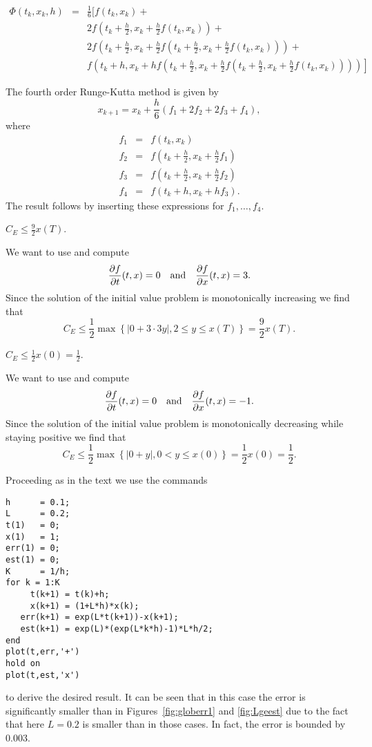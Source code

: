 \documentclass{ximera}
\begin{document}
 \ans
\begin{eqnarray*}
\Phi(t_k,x_k,h) & = & \frac{1}{6}\Big[f(t_k,x_k)+\\
&&2f\left(t_k+\frac{h}{2},x_k+\frac{h}{2}f(t_k,x_k)\right) +\\
&&2f\left(t_k+\frac{h}{2},x_k+
  \frac{h}{2}f\left(t_k+\frac{h}{2},x_k+\frac{h}{2}f(t_k,x_k)\right)\right)+\\
&&\left.f\left(t_k+h,x_k+hf\left(t_k+\frac{h}{2},x_k+
  \frac{h}{2}f\left(t_k+\frac{h}{2},x_k+
  \frac{h}{2}f(t_k,x_k)\right)\right)\right)\right]
\end{eqnarray*}

\soln The fourth order Runge-Kutta method is given by
\[
x_{k+1} = x_k+\frac{h}{6}(f_1+2f_2+2f_3+f_4),
\]
where
\begin{eqnarray*}
f_1 &=& f(t_k,x_k)\\
f_2 &=& f\left(t_k+\frac{h}{2},x_k+\frac{h}{2}f_1\right)\\
f_3 &=& f\left(t_k+\frac{h}{2},x_k+\frac{h}{2}f_2\right)\\
f_4 &=& f(t_k+h,x_k+hf_3).
\end{eqnarray*}
The result follows by inserting these expressions for $f_1,\ldots,f_4$.

 \ans $C_E \le \frac{9}{2}x(T)$.

\soln We want to use  and compute
\[
\frac{\partial f}{\partial t}(t,x)=0\quad\mbox{and}\quad
\frac{\partial f}{\partial x}(t,x)=3.
\]
Since the solution of the initial value problem is monotonically
increasing we find that
\[
C_E\le \frac{1}{2}\max\left\{ \left\vert 0+3\cdot 3y\right\vert,
2\le y\le x(T) \right\} = \frac{9}{2}x(T).
\]

 \ans $C_E \le \frac{1}{2}x(0)=\frac{1}{2}$.

\soln We want to use  and compute
\[
\frac{\partial f}{\partial t}(t,x)=0\quad\mbox{and}\quad
\frac{\partial f}{\partial x}(t,x)=-1.
\]
Since the solution of the initial value problem is monotonically
decreasing while staying positive we find that
\[
C_E\le \frac{1}{2}\max\left\{ \left\vert 0+y\right\vert,
0<y\le x(0) \right\} = \frac{1}{2}x(0)=\frac{1}{2}.
\]


Proceeding as in the text we use the \Matlab commands
\begin{verbatim}
h      = 0.1;
L      = 0.2;
t(1)   = 0;
x(1)   = 1;
err(1) = 0;
est(1) = 0;
K      = 1/h;
for k = 1:K
     t(k+1) = t(k)+h;
     x(k+1) = (1+L*h)*x(k);
   err(k+1) = exp(L*t(k+1))-x(k+1);
   est(k+1) = exp(L)*(exp(L*k*h)-1)*L*h/2;
end
plot(t,err,'+')
hold on
plot(t,est,'x')
\end{verbatim}
to derive the desired result.  It can be seen that in this case
the error is significantly smaller than in Figures~\ref{fig:globerr1}
and \ref{fig:Lgeest} due to the fact that here $L=0.2$ is smaller
than in those cases.  In fact, the error is bounded by $0.003$.
\end{document}
